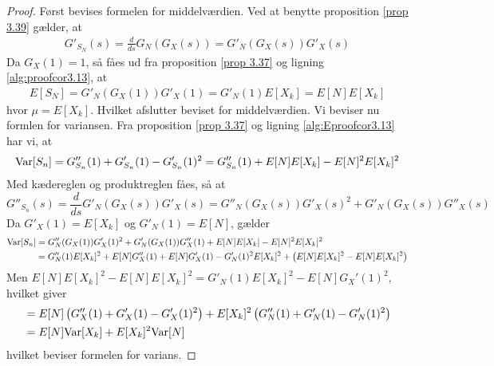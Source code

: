 \begin{proof}
Først bevises formelen for middelværdien. Ved at benytte  proposition \ref{prop 3.39} gælder, at
\begin{align} \label{alg:proofcor3.13}
    G'_{S_N}(s) = \frac{d}{ds}G_N(G_X(s))=G'_N(G_X(s))G'_X(s)
\end{align}
Da $G_X(1)=1$, så fåes ud fra proposition \ref{prop 3.37} og ligning \eqref{alg:proofcor3.13}, at
\begin{align} \label{alg:Eproofcor3.13}
    E[S_N]= G'_N(G_X(1))G'_X(1)=G'_N(1)E[X_k]=E[N]E[X_k]
\end{align}
hvor $\mu=E[X_k]$. Hvilket afslutter beviset for middelværdien. Vi beviser nu formlen for variansen. Fra proposition \ref{prop 3.37} og ligning \eqref{alg:Eproofcor3.13} har vi, at 
\begin{equation*}
    \textnormal{Var}[S_n] = G''_{S_n}(1) + G'_{S_n}(1) - G'_{S_n}(1)^2 = G''_{S_n}(1) + E[N]E[X_k] - E[N]^2E[X_k]^2
\end{equation*}
Med kædereglen og produktreglen fåes, så at
\begin{equation*}
    G''_{S_n}(s) = \frac{d}{ds} G'_N(G_X(s))G'_X(s) = G''_N(G_X(s))G'_X(s)^2 + G'_N(G_X(s))G''_X(s)
\end{equation*}
Da $G'_X(1)=E[X_k]$ og $G'_N(1)=E[N]$, gælder
\begin{align*}
    \textnormal{Var}[S_n]&= 
     G''_N(G_X(1))G'_X(1)^2 + G'_N(G_X(1))G''_X(1)
    + E[N]E[X_k] - E[N]^2E[X_k]^2
    \\
    &= G''_N(1)E[X_k]^2 + E[N] G''_X(1) + E[N]G'_X(1) - G'_N(1)^2E[X_k]^2 + \left(E[N]E[X_k]^2 - E[N]E[X_k]^2\right)
\end{align*}
Men $E[N]E[X_k]^2 - E[N]E[X_k]^2 = G'_N(1)E[X_k]^2 - E[N]G_X'(1)^2$, hvilket giver
\begin{align*}
    &= E[N]\left(G''_X(1) + G'_X(1) - G'_X(1)^2 \right) + E[X_k]^2\left(G''_N(1) + G'_N(1) - G'_N(1)^2\right)
    \\
    &= E[N]\textnormal{Var}[X_k] + E[X_k]^2\textnormal{Var}[N]
\end{align*}
hvilket beviser formelen for varians.
\end{proof}

